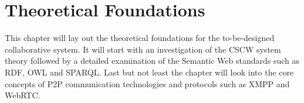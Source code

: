 
\chapter{Theoretical Foundations} %
\label{cha:theoretical_foundations}

This chapter will lay out the theoretical foundations for the to-be-designed collaborative system. It will start with an investigation of the \gls{CSCW} system theory followed by a detailed examination of the Semantic Web standards such as \gls{RDF}, \gls{OWL} and \gls{SPARQL}. Last but not least the chapter will look into the core concepts of \gls{P2P} communication technologies and protocols such as \gls{XMPP} and \gls{WebRTC}.









